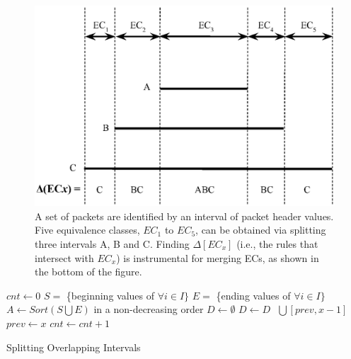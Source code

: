 \begin{figure}[t]
    \centering
    \includegraphics[scale=.52]{OneBigSwitch/figures/DisjointECs.eps}
    \caption[Equivalence Classes as Disjoint Intervals]{A set of packets are identified by
    an interval of packet header values.
    Five equivalence classes, $EC_1$ to $EC_5$, can be obtained via splitting three intervals
    A, B and C.
    Finding $\Delta[EC_x]$ (i.e., the rules that intersect with $EC_x$) is instrumental for
    merging ECs, as shown in the bottom of the figure.}
    \label{OBS:Fig:DisjointECsAsInterval}
\end{figure}

\begin{algorithm}[t]
    \DontPrintSemicolon
    $cnt \gets 0$\;
    $S = $ \{beginning values of $\forall i \in I\}$\;
    $E = $ \{ending values of $\forall i \in I\}$\;
    $A \gets Sort(S \bigcup E)$ in a non-decreasing order\;
    $D \gets \emptyset$\;
     {
         {
             {\label{OBS:Alg:LineEndStart1}
            $D \gets D \text{ }\bigcup \text{} [prev, x-1]$\;
            }\label{OBS:Alg:LineEndStart2}
            $prev \gets x$\;\label{OBS:Alg:LineNewPrev1}
            $cnt \gets cnt + 1$\;
        }
    }
    \caption{Splitting Overlapping Intervals}
    \label{OBS:Alg:GenDisjointECs}
\end{algorithm}

